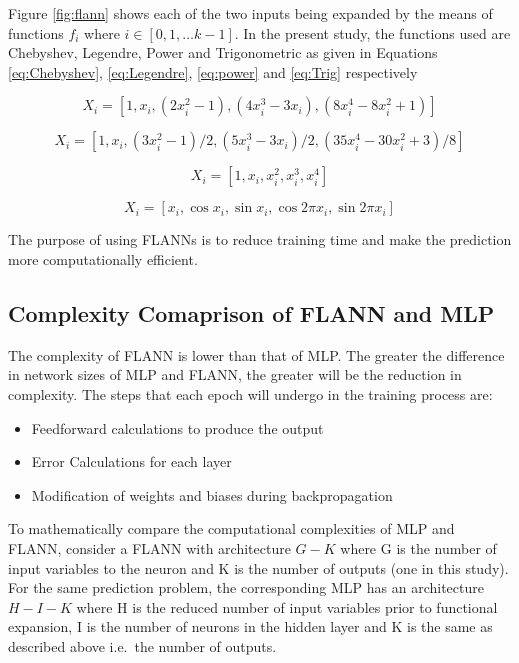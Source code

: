 \documentclass[]{article}
\providecommand{\tightlist}{%
  \setlength{\itemsep}{0pt}\setlength{\parskip}{0pt}}
\begin{document}
Figure \ref{fig:flann} shows each of the two inputs being expanded by the means of functions \(f_i\) where \(i \in [0,1, \ldots k-1]\). In the present study, the functions used are Chebyshev, Legendre, Power and Trigonometric as given in Equations \ref{eq:Chebyshev}, \ref{eq:Legendre}, \ref{eq:power} and \ref{eq:Trig} respectively

\begin{equation}
X_i=[1,x_i,( 2x_i^2-1),( 4x_i^3-3x_i ),( 8x_i^4-8x_i^2+1)] \label{eq:Chebyshev}
\end{equation}

\begin{equation}
X_i=[1,x_i,( 3x_i^2-1)/2,( 5x_i^3-3x_i)/2,( 35x_i^4-30x_i^2+3)/8] \label{eq:Legendre}
\end{equation}

\begin{equation}
X_i=[1,x_i,x_i^2,x_i^3,x_i^4]\label{eq:power}
\end{equation}

\begin{equation}
X_i=[x_i,\cos x_i, \sin x_i,\cos 2\pi x_i,\sin 2\pi x_i] \label{eq:Trig}
\end{equation}

The purpose of using FLANNs is to reduce training time and make the prediction more computationally efficient.

\hypertarget{complexity-comaprison-of-flann-and-mlp}{%
\subsection{Complexity Comaprison of FLANN and MLP}\label{complexity-comaprison-of-flann-and-mlp}}

The complexity of FLANN is lower than that of MLP. The greater the difference in network sizes of MLP and FLANN, the greater will be the reduction in complexity. The steps that each epoch will undergo in the training process are:

\begin{itemize}
\tightlist
\item
  Feedforward calculations to produce the output
\item
  Error Calculations for each layer
\item
  Modification of weights and biases during backpropagation
\end{itemize}

To mathematically compare the computational complexities of MLP and FLANN, consider a FLANN with architecture \({G-K}\) where G is the number of input variables to the neuron and K is the number of outputs (one in this study). For the same prediction problem, the corresponding MLP has an architecture \({H-I-K}\) where H is the reduced number of input variables prior to functional expansion, I is the number of neurons in the hidden layer and K is the same as described above i.e.~the number of outputs.
\end{document}
